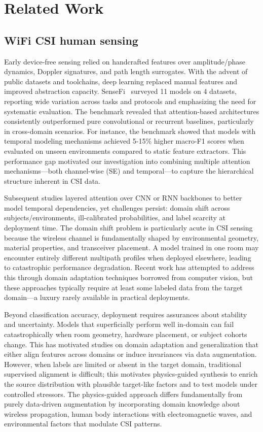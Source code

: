 \documentclass[journal]{IEEEtran}
\begin{document}
\section{Related Work}
\subsection{WiFi CSI human sensing}
Early device-free sensing relied on handcrafted features over amplitude/phase dynamics, Doppler signatures, and path length surrogates. With the advent of public datasets and toolchains, deep learning replaced manual features and improved abstraction capacity. SenseFi~\cite{yang2023sensefi} surveyed 11 models on 4 datasets, reporting wide variation across tasks and protocols and emphasizing the need for systematic evaluation. The benchmark revealed that attention-based architectures consistently outperformed pure convolutional or recurrent baselines, particularly in cross-domain scenarios. For instance, the benchmark showed that models with temporal modeling mechanisms achieved 5-15\% higher macro-F1 scores when evaluated on unseen environments compared to static feature extractors. This performance gap motivated our investigation into combining multiple attention mechanisms—both channel-wise (SE) and temporal—to capture the hierarchical structure inherent in CSI data.

Subsequent studies layered attention over CNN or RNN backbones to better model temporal dependencies, yet challenges persist: domain shift across subjects/environments, ill-calibrated probabilities, and label scarcity at deployment time. The domain shift problem is particularly acute in CSI sensing because the wireless channel is fundamentally shaped by environmental geometry, material properties, and transceiver placement. A model trained in one room may encounter entirely different multipath profiles when deployed elsewhere, leading to catastrophic performance degradation. Recent work has attempted to address this through domain adaptation techniques borrowed from computer vision, but these approaches typically require at least some labeled data from the target domain—a luxury rarely available in practical deployments.

Beyond classification accuracy, deployment requires assurances about stability and uncertainty. Models that superficially perform well in-domain can fail catastrophically when room geometry, hardware placement, or subject cohorts change. This has motivated studies on domain adaptation and generalization that either align features across domains or induce invariances via data augmentation. However, when labels are limited or absent in the target domain, traditional supervised alignment is difficult; this motivates physics-guided synthesis to enrich the source distribution with plausible target-like factors and to test models under controlled stressors. The physics-guided approach differs fundamentally from purely data-driven augmentation by incorporating domain knowledge about wireless propagation, human body interactions with electromagnetic waves, and environmental factors that modulate CSI patterns.
\end{document}
